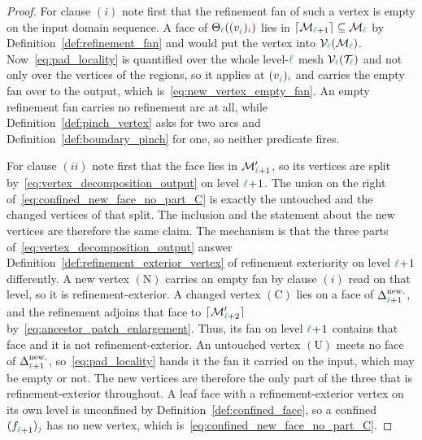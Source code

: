 \documentclass[a4paper, 12pt]{article}
\makeatletter
\newcommand{\green}{\color{ForestGreen}}
\newcommand{\brickred}{\color{BrickRed}}
\newcommand{\T}{\mathcal{T}}
\newcommand{\V}{\mathcal{V}}
\DeclareRobustCommand{\simplexsubsetNew}[2][]{\Delta^{\mathrm{new}\ifx\@empty#1\@empty\else,#1\fi}_{#2}}
\newcommand{\vertex}[2]{\freeQ{v}{}{#1}{#2}}
\newcommand{\face}[2]{\freeQ{f}{}{#1}{#2}}
\newcommand{\coarseIdxone}{{\brickred i}}
\newcommand{\fineIdxone}{{\brickred j}}
\renewcommand{\l}{{\green\ell}}
\newcommand{\freeQ}[4]{ ( {#1}^{#2}_{#3} )_{#4}}
\newcommand{\M}{\mathcal{M}}
\theoremstyle{definition}
\theoremstyle{plain}
\numberwithin{equation}{section}
\newcommand{\ancestorPatch}[1]{\lceil #1 \rceil}
\newcommand{\refFan}[1]{\Theta_{#1}}                        %
\makeatother
\begin{document}
\begin{proof}
    For clause $(i)$ note first that the refinement fan of such a vertex is empty on the input domain sequence. A face of $\refFan{\l}(\vertex{\l}{\coarseIdxone})$ lies in $\ancestorPatch{\M_{\l+1}} \subseteq \M_\l$ by Definition~\ref{def:refinement_fan} and would put the vertex into $\V_\l(\M_\l)$. Now~\eqref{eq:pad_locality} is quantified over the whole level-$\l$ mesh $\V_\l(\T_\l)$ and not only over the vertices of the regions, so it applies at $\vertex{\l}{\coarseIdxone}$ and carries the empty fan over to the output, which is~\eqref{eq:new_vertex_empty_fan}. An empty refinement fan carries no refinement arc at all, while Definition~\ref{def:pinch_vertex} asks for two arcs and Definition~\ref{def:boundary_pinch} for one, so neither predicate fires.

    For clause $(ii)$ note first that the face lies in $\M'_{\l+1}$, so its vertices are split by~\eqref{eq:vertex_decomposition_output} on level $\l\!+\!1$. The union on the right of~\eqref{eq:confined_new_face_no_part_C} is exactly the untouched and the changed vertices of that split. The inclusion and the statement about the new vertices are therefore the same claim. The mechanism is that the three parts of~\eqref{eq:vertex_decomposition_output} answer Definition~\ref{def:refinement_exterior_vertex} of refinement exteriority on level $\l\!+\!1$ differently. A new vertex $(\mathrm{N})$ carries an empty fan by clause $(i)$ read on that level, so it is refinement-exterior. A changed vertex $(\mathrm{C})$ lies on a face of $\simplexsubsetNew{\l+1}$, and the refinement adjoins that face to $\ancestorPatch{\M'_{\l+2}}$ by~\eqref{eq:ancestor_patch_enlargement}. Thus, its fan on level $\l\!+\!1$ contains that face and it is not refinement-exterior. An untouched vertex $(\mathrm{U})$ meets no face of $\simplexsubsetNew{\l+1}$, so~\eqref{eq:pad_locality} hands it the fan it carried on the input, which may be empty or not. The new vertices are therefore the only part of the three that is refinement-exterior throughout. A leaf face with a refinement-exterior vertex on its own level is unconfined by Definition~\ref{def:confined_face}, so a confined $\face{\l+1}{\fineIdxone}$ has no new vertex, which is~\eqref{eq:confined_new_face_no_part_C}.
\end{proof}
\end{document}
